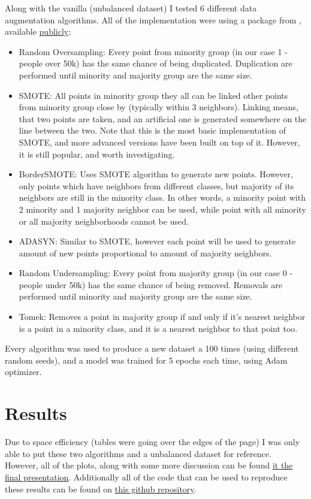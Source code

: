 \documentclass{article}
\begin{document}
Along with the vanilla (unbalanced dataset) I tested 6 different data augmentation algorithms. All of the implementation were using a package from \cite{JMLR:v18:16-365}, available \href{https://imbalanced-learn.readthedocs.io/en/stable/index.html}{publicly}:
\begin{itemize}
	\item Random Oversampling: Every point from minority group (in our case 1 - people over 50k) has the same chance of being duplicated. Duplication are performed until minority and majority group are the same size.
	\item SMOTE: All points in minority group they all can be linked other points from minority group close by (typically within 3 neighbors). Linking means, that two points are taken, and an artificial one is generated somewhere on the line between the two. Note that this is the most basic implementation of SMOTE, and more advanced versions have been built on top of it. However, it is still popular, and worth investigating.
	\item BorderSMOTE: Uses SMOTE algorithm to generate new points. However, only points which have neighbors from different classes, but majority of its neighbors are still in the minority class. In other words, a minority point with 2 minority and 1 majority neighbor can be used, while point with all minority or all majority neighborhoods cannot be used.
	\item ADASYN: Similar to SMOTE, however each point will be used to generate amount of new points proportional to amount of majority neighbors.
	\item Random Undersampling: Every point from majority group (in our case 0 - people under 50k) has the same chance of being removed. Removals are performed until minority and majority group are the same size.
	\item Tomek: Removes a point in majority group if and only if it's nearest neighbor is a point in a minority class, and it is a nearest neighbor to that point too.
\end{itemize}

Every algorithm was used to produce a new dataset a 100 times (using different random seeds), and a model was trained for 5 epochs each time, using Adam optimizer.

\section{Results}

Due to space efficiency (tables were going over the edges of the page) I was only able to put these two algorithms and a unbalanced dataset for reference. However, all of the plots, along with some more discussion can be found \href{https://docs.google.com/presentation/d/1f27Qyvyg0sc9aOAcSGB4ifR7f2SYnvqD9Y22beVF9gg/edit?usp=sharing}{it the final presentation}. Additionally all of the code that can be used to reproduce these results can be found on \href{https://github.com/balbok0/599m-final}{this github repository}.
\end{document}
